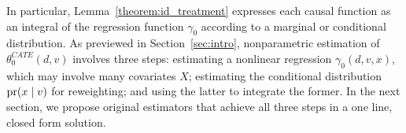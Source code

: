 In particular, Lemma~\ref{theorem:id_treatment} expresses each causal function as an integral of the regression function $\gamma_0$ according to a marginal or conditional distribution. As previewed in Section~\ref{sec:intro}, nonparametric estimation of $\theta_0^{CATE}(d,v)$ involves three steps: estimating a nonlinear regression $\gamma_0(d,v,x)$, which may involve many covariates $X$; estimating the conditional distribution $\text{\normalfont pr}(x \mid v)$ for reweighting; and using the latter to integrate the former. In the next section, we propose original estimators that achieve all three steps in a one line, closed form solution. 
